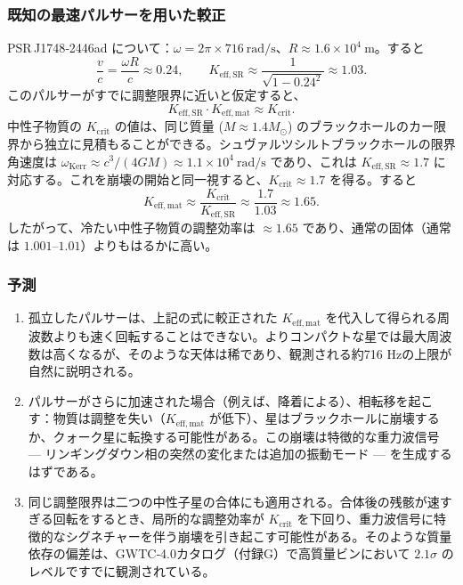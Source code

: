 \documentclass[12pt,a4paper]{article}
\begin{document}
	\subsubsection{既知の最速パルサーを用いた較正}
	
	PSR J1748‑2446ad について：\(\omega = 2\pi\times716\ \text{rad/s}\)、\(R\approx 1.6\times10^4\ \text{m}\)。すると
	\[
	\frac{v}{c} = \frac{\omega R}{c} \approx 0.24,\qquad
	K_{\mathrm{eff,SR}} \approx \frac{1}{\sqrt{1-0.24^2}} \approx 1.03.
	\]
	このパルサーがすでに調整限界に近いと仮定すると、
	\[
	K_{\mathrm{eff,SR}} \cdot K_{\mathrm{eff,mat}} \approx K_{\mathrm{crit}}.
	\]
	中性子物質の \(K_{\mathrm{crit}}\) の値は、同じ質量 (\(M\approx1.4M_\odot\)) のブラックホールのカー限界から独立に見積もることができる。シュヴァルツシルトブラックホールの限界角速度は \(\omega_{\text{Kerr}} \approx c^3/(4GM) \approx 1.1\times10^4\ \text{rad/s}\) であり、これは \(K_{\mathrm{eff,SR}} \approx 1.7\) に対応する。これを崩壊の開始と同一視すると、\(K_{\mathrm{crit}} \approx 1.7\) を得る。すると
	\[
	K_{\mathrm{eff,mat}} \approx \frac{K_{\mathrm{crit}}}{K_{\mathrm{eff,SR}}} \approx \frac{1.7}{1.03} \approx 1.65.
	\]
	したがって、冷たい中性子物質の調整効率は \(\approx 1.65\) であり、通常の固体（通常は \(1.001\)–\(1.01\)）よりもはるかに高い。
	
	\subsubsection{予測}
	
	\begin{enumerate}
		\item 孤立したパルサーは、上記の式に較正された \(K_{\mathrm{eff,mat}}\) を代入して得られる周波数よりも速く回転することはできない。よりコンパクトな星では最大周波数は高くなるが、そのような天体は稀であり、観測される約716 Hzの上限が自然に説明される。
		\item パルサーがさらに加速された場合（例えば、降着による）、相転移を起こす：物質は調整を失い（\(K_{\mathrm{eff,mat}}\) が低下）、星はブラックホールに崩壊するか、クォーク星に転換する可能性がある。この崩壊は特徴的な重力波信号 — リンギングダウン相の突然の変化または追加の振動モード — を生成するはずである。
		\item 同じ調整限界は二つの中性子星の合体にも適用される。合体後の残骸が速すぎる回転をするとき、局所的な調整効率が \(K_{\mathrm{crit}}\) を下回り、重力波信号に特徴的なシグネチャーを伴う崩壊を引き起こす可能性がある。そのような質量依存の偏差は、GWTC‑4.0カタログ（付録G）で高質量ビンにおいて \(2.1\sigma\) のレベルですでに観測されている。
	\end{enumerate}
	
\end{document}
